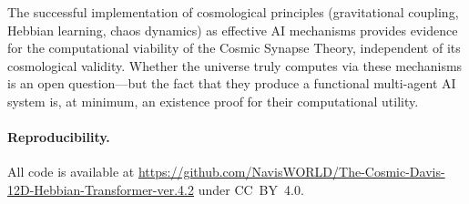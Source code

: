 \documentclass[11pt,a4paper]{article}
\begin{document}
The successful implementation of cosmological principles (gravitational coupling, Hebbian learning, chaos dynamics) as effective AI mechanisms provides evidence for the computational viability of the Cosmic Synapse Theory, independent of its cosmological validity. Whether the universe truly computes via these mechanisms is an open question---but the fact that they produce a functional multi-agent AI system is, at minimum, an existence proof for their computational utility.

\paragraph{Reproducibility.} All code is available at \url{https://github.com/NavisWORLD/The-Cosmic-Davis-12D-Hebbian-Transformer-ver.4.2} under CC~BY~4.0.



\end{document}
